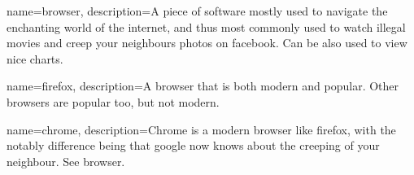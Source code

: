 {
  name=browser,
  description={A piece of software mostly used to navigate the enchanting world of the internet, and thus most commonly
used to watch illegal movies and creep your neighbours photos on facebook. Can be also used to view nice charts.}
}


{
  name=firefox,
  description={A browser that is both modern and popular. Other browsers are popular too, but not modern. }
}


{
  name=chrome,
  description={Chrome is a modern browser like firefox, with the notably difference being that google now knows about the
creeping of your neighbour. See browser.}
}


